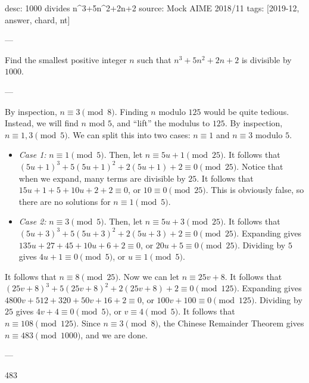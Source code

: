 desc: 1000 divides n^3+5n^2+2n+2
source: Mock AIME 2018/11
tags: [2019-12, answer, chard, nt]

---

Find the smallest positive integer $n$ such that $n^3+5n^2+2n+2$ is divisible by $1000$.

---

By inspection, $n\equiv 3\pmod{8}$. Finding $n$ modulo $125$ would be quite tedious. Instead, we will find $n$ mod $5$, and ``lift'' the modulus to $125$. By inspection, $n\equiv 1,3\pmod{5}$. We can split this into two cases: $n\equiv 1$ and $n\equiv 3$ modulo $5$.
\begin{itemize}
\item \textit{Case 1:} $n\equiv 1\pmod{5}$. Then, let $n\equiv 5u+1\pmod{25}$. It follows that $(5u+1)^3+5(5u+1)^2+2(5u+1)+2\equiv 0\pmod{25}$. Notice that when we expand, many terms are divisible by $25$. It follows that $15u+1+5+10u+2+2\equiv 0$, or $10\equiv 0\pmod{25}$. This is obviously false, so there are no solutions for $n\equiv 1\pmod{5}$.
\item \textit{Case 2:} $n\equiv 3\pmod{5}$. Then, let $n\equiv 5u+3\pmod{25}$. It follows that $(5u+3)^3+5(5u+3)^2+2(5u+3)+2\equiv 0\pmod{25}$. Expanding gives $135u+27+45+10u+6+2\equiv 0$, or $20u+5\equiv 0\pmod{25}$. Dividing by $5$ gives $4u+1\equiv 0\pmod{5}$, or $u\equiv 1\pmod{5}$.
\end{itemize}
It follows that $n\equiv 8\pmod{25}$. Now we can let $n\equiv 25v+8$. It follows that $(25v+8)^3+5(25v+8)^2+2(25v+8)+2\equiv 0\pmod{125}$. Expanding gives $4800v+512+320+50v+16+2\equiv 0$, or $100v+100\equiv 0\pmod{125}$. Dividing by $25$ gives $4v+4\equiv 0\pmod{5}$, or $v\equiv 4\pmod{5}$. It follows that $n\equiv 108\pmod{125}$. Since $n\equiv 3\pmod{8}$, the Chinese Remainder Theorem gives $n\equiv 483\pmod{1000}$, and we are done.

---

483
